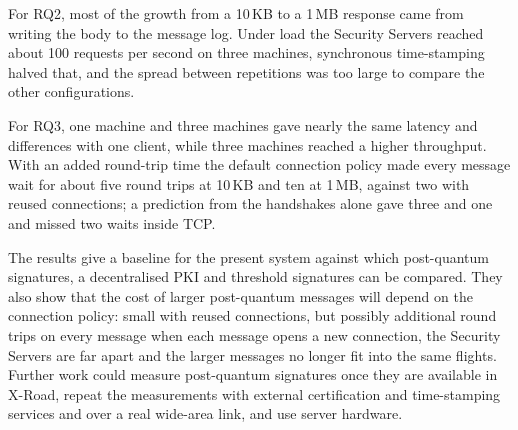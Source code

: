 \documentclass[conference,a4paper]{IEEEtran}
\begin{document}
For RQ2, most of the growth from a 10\,KB to a 1\,MB response came from writing the body to the
message log. Under load the Security Servers reached about 100 requests per second on three machines,
synchronous time-stamping halved that, and the spread between repetitions was too large to compare
the other configurations.

For RQ3, one machine and three machines gave nearly the same latency and differences with one
client, while three machines reached a higher throughput. With an added round-trip time the default
connection policy made every message wait for about five round trips at 10\,KB and ten at 1\,MB,
against two with reused connections; a prediction from the handshakes alone gave three and one and
missed two waits inside TCP.

The results give a baseline for the present system against which post-quantum signatures, a
decentralised PKI and threshold signatures can be compared. They also show that the cost of larger
post-quantum messages will depend on the connection policy: small with reused connections, but
possibly additional round trips on every message when each message opens a new connection, the
Security Servers are far apart and the larger messages no longer fit into the same flights. Further work could measure post-quantum
signatures once they are available in X-Road, repeat the measurements with external certification and
time-stamping services and over a real wide-area link, and use server hardware.
\end{document}
